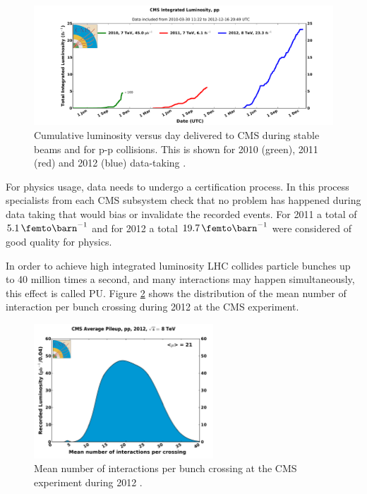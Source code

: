 \begin{figure}[!htb]
  \centering
  \includegraphics[width=1.00\textwidth]{Chapter02/CMS/Images/CMS_IntegratedLumi_pp_2010-2012}
  \caption{Cumulative luminosity versus day delivered to CMS during stable beams and for p-p collisions. This is shown for 2010 (green), 2011 (red) and 2012 (blue) data-taking \cite{IMAGEREF:CMSIntegratedLuminosity}.}
  \label{FIGURE:ExperimentalApparatus_CMS_IntegratedLumi_pp_2010-2012}
\end{figure}

For physics usage, data needs to undergo a certification process. In this process specialists from each \gls{CMS} subsystem check that no problem has happened during data taking that would bias or invalidate the recorded events. For 2011 a total of $5.1\,\femto\barn^{-1}$ and for 2012 a total $19.7\,\femto\barn^{-1}$ were considered of good quality for physics. 

In order to achieve high integrated luminosity \gls{LHC} collides particle bunches up to 40 million times a second, and many interactions may happen simultaneously, this effect is called \gls{PU}. Figure \ref{FIGURE:ExperimentalApparatus_CMS_PileIp_pp_2012} shows the distribution of the mean number of interaction per bunch crossing during 2012 at the \gls{CMS} experiment.

\begin{figure}[!htb]
  \centering
  \includegraphics[width=0.60\textwidth]{Chapter02/CMS/Images/CMS_PileIp_pp_2012}
  \caption{Mean number of interactions per bunch crossing at the CMS experiment during 2012 \cite{IMAGEREF:CMSAveragePileUp2012}.}
  \label{FIGURE:ExperimentalApparatus_CMS_PileIp_pp_2012}
\end{figure}

